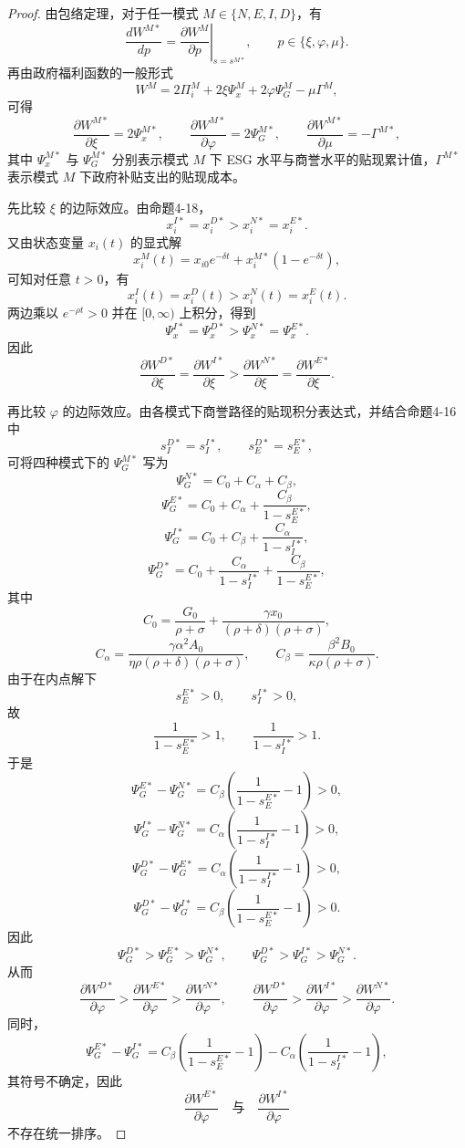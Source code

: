 \begin{proof}
由包络定理，对于任一模式 \(M\in\{N,E,I,D\}\)，有
\[
\frac{dW^{M*}}{dp}
=
\left.\frac{\partial W^M}{\partial p}\right|_{s=s^{M*}},
\qquad p\in\{\xi,\varphi,\mu\}.
\]
再由政府福利函数的一般形式
\[
W^M=2\Pi_i^M+2\xi\Psi_x^M+2\varphi\Psi_G^M-\mu\Gamma^M,
\]
可得
\[
\frac{\partial W^{M*}}{\partial \xi}=2\Psi_x^{M*},\qquad
\frac{\partial W^{M*}}{\partial \varphi}=2\Psi_G^{M*},\qquad
\frac{\partial W^{M*}}{\partial \mu}=-\Gamma^{M*},
\]
其中 \(\Psi_x^{M*}\) 与 \(\Psi_G^{M*}\) 分别表示模式 \(M\) 下 ESG 水平与商誉水平的贴现累计值，\(\Gamma^{M*}\) 表示模式 \(M\) 下政府补贴支出的贴现成本。

先比较 \(\xi\) 的边际效应。由命题4-18，
\[
x_i^{I*}=x_i^{D*}>x_i^{N*}=x_i^{E*}.
\]
又由状态变量 \(x_i(t)\) 的显式解
\[
x_i^M(t)=x_{i0}e^{-\delta t}+x_i^{M*}(1-e^{-\delta t}),
\]
可知对任意 \(t>0\)，有
\[
x_i^{I}(t)=x_i^{D}(t)>x_i^{N}(t)=x_i^{E}(t).
\]
两边乘以 \(e^{-\rho t}>0\) 并在 \([0,\infty)\) 上积分，得到
\[
\Psi_x^{I*}=\Psi_x^{D*}>\Psi_x^{N*}=\Psi_x^{E*}.
\]
因此
\[
\frac{\partial W^{D*}}{\partial \xi}
=
\frac{\partial W^{I*}}{\partial \xi}
>
\frac{\partial W^{N*}}{\partial \xi}
=
\frac{\partial W^{E*}}{\partial \xi}.
\]

再比较 \(\varphi\) 的边际效应。由各模式下商誉路径的贴现积分表达式，并结合命题4-16中
\[
s_I^{D*}=s_I^{I*},\qquad s_E^{D*}=s_E^{E*},
\]
可将四种模式下的 \(\Psi_G^{M*}\) 写为
\[
\Psi_G^{N*}=C_0+C_\alpha+C_\beta,
\]
\[
\Psi_G^{E*}=C_0+C_\alpha+\frac{C_\beta}{1-s_E^{E*}},
\]
\[
\Psi_G^{I*}=C_0+C_\beta+\frac{C_\alpha}{1-s_I^{I*}},
\]
\[
\Psi_G^{D*}=C_0+\frac{C_\alpha}{1-s_I^{I*}}+\frac{C_\beta}{1-s_E^{E*}},
\]
其中
\[
C_0=\frac{G_0}{\rho+\sigma}+\frac{\gamma x_0}{(\rho+\delta)(\rho+\sigma)},
\]
\[
C_\alpha=\frac{\gamma\alpha^2A_0}{\eta\rho(\rho+\delta)(\rho+\sigma)},
\qquad
C_\beta=\frac{\beta^2B_0}{\kappa\rho(\rho+\sigma)}.
\]
由于在内点解下
\[
s_E^{E*}>0,\qquad s_I^{I*}>0,
\]
故
\[
\frac{1}{1-s_E^{E*}}>1,\qquad \frac{1}{1-s_I^{I*}}>1.
\]
于是
\[
\Psi_G^{E*}-\Psi_G^{N*}
=
C_\beta\left(\frac{1}{1-s_E^{E*}}-1\right)>0,
\]
\[
\Psi_G^{I*}-\Psi_G^{N*}
=
C_\alpha\left(\frac{1}{1-s_I^{I*}}-1\right)>0,
\]
\[
\Psi_G^{D*}-\Psi_G^{E*}
=
C_\alpha\left(\frac{1}{1-s_I^{I*}}-1\right)>0,
\]
\[
\Psi_G^{D*}-\Psi_G^{I*}
=
C_\beta\left(\frac{1}{1-s_E^{E*}}-1\right)>0.
\]
因此
\[
\Psi_G^{D*}>\Psi_G^{E*}>\Psi_G^{N*},\qquad
\Psi_G^{D*}>\Psi_G^{I*}>\Psi_G^{N*}.
\]
从而
\[
\frac{\partial W^{D*}}{\partial \varphi}
>
\frac{\partial W^{E*}}{\partial \varphi}
>
\frac{\partial W^{N*}}{\partial \varphi},
\qquad
\frac{\partial W^{D*}}{\partial \varphi}
>
\frac{\partial W^{I*}}{\partial \varphi}
>
\frac{\partial W^{N*}}{\partial \varphi}.
\]
同时，
\[
\Psi_G^{E*}-\Psi_G^{I*}
=
C_\beta\left(\frac{1}{1-s_E^{E*}}-1\right)
-
C_\alpha\left(\frac{1}{1-s_I^{I*}}-1\right),
\]
其符号不确定，因此
\[
\frac{\partial W^{E*}}{\partial \varphi}
\quad\text{与}\quad
\frac{\partial W^{I*}}{\partial \varphi}
\]
不存在统一排序。


\end{proof}
